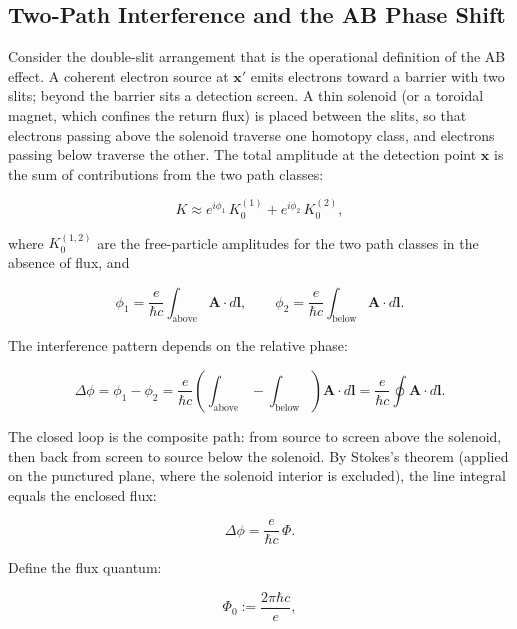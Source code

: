\subsection{Two-Path Interference and the AB Phase Shift}

Consider the double-slit arrangement that is the operational definition of the AB effect. A coherent electron source at $\bm x'$ emits electrons toward a barrier with two slits; beyond the barrier sits a detection screen. A thin solenoid (or a toroidal magnet, which confines the return flux) is placed between the slits, so that electrons passing above the solenoid traverse one homotopy class, and electrons passing below traverse the other. The total amplitude at the detection point $\bm x$ is the sum of contributions from the two path classes:
\begin{linenomath}
\begin{equation}
K \approx e^{i\phi_1}\,K_0^{(1)} + e^{i\phi_2}\,K_0^{(2)},
\end{equation}
\end{linenomath}
where $K_0^{(1,2)}$ are the free-particle amplitudes for the two path classes in the absence of flux, and
\begin{linenomath}
\begin{equation}
\phi_1 = \frac{e}{\hbar c}\int_{\text{above}}\!\!\!\!\bm A\cdot d\bm l,\qquad
\phi_2 = \frac{e}{\hbar c}\int_{\text{below}}\!\!\!\!\bm A\cdot d\bm l.
\end{equation}
\end{linenomath}
The interference pattern depends on the relative phase:
\begin{linenomath}
\begin{equation*}
\Delta\phi = \phi_1 - \phi_2 = \frac{e}{\hbar c}\left(\int_{\text{above}} - \int_{\text{below}}\right)\bm A\cdot d\bm l = \frac{e}{\hbar c}\oint \bm A\cdot d\bm l.
\end{equation*}
\end{linenomath}
The closed loop is the composite path: from source to screen above the solenoid, then back from screen to source below the solenoid. By Stokes's theorem (applied on the punctured plane, where the solenoid interior is excluded), the line integral equals the enclosed flux:
\begin{linenomath}
\begin{equation*}
\Delta\phi = \frac{e}{\hbar c}\,\Phi.
\end{equation*}
\end{linenomath}
Define the flux quantum:
\begin{linenomath}
\begin{equation}
\Phi_0 := \frac{2\pi\hbar c}{e},
\label{eq:flux-quantum}
\end{equation}
\end{linenomath}
